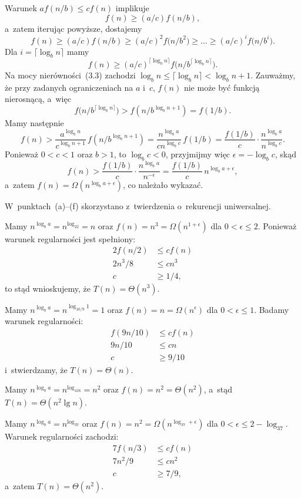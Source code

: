 \exercise %
Warunek $af(n/b)\le cf(n)$ implikuje
\[
	f(n) \ge (a/c)f(n/b),
\]
a~zatem iterując powyższe, dostajemy
\[
	f(n) \ge (a/c)f(n/b) \ge (a/c)^2f\bigl(n/b^2\bigr) \ge \dots \ge (a/c)^if\bigl(n/b^i\bigr).
\]
Dla $i=\lceil\log_bn\rceil$ mamy
\[
	f(n) \ge (a/c)^{\lceil\log_bn\rceil}f\bigl(n/b^{\lceil\log_bn\rceil}\bigr).
\]
Na mocy nierówności~(3.3) zachodzi $\log_bn\le\lceil\log_b n\rceil<\log_bn+1$. Zauważmy, że przy zadanych ograniczeniach na $a$ i~$c$, $f(n)$ nie może być funkcją nierosnącą, a~więc
\[
	f\bigl(n/b^{\lceil\log_bn\rceil}\bigr) > f(n/b^{\log_bn+1}) = f(1/b).
\]
Mamy następnie
\[
	f(n) > \frac{a^{\log_bn}}{c^{\log_bn+1}}\,f(n/b^{\log_bn+1}) = \frac{n^{\log_ba}}{cn^{\log_bc}}\,f(1/b) = \frac{f(1/b)}{c}\cdot\frac{n^{\log_ba}}{n^{\log_bc}}.
\]
Ponieważ $0<c<1$ oraz $b>1$, to $\log_bc<0$, przyjmijmy więc $\epsilon=-\log_bc$, skąd
\[
	f(n) > \frac{f(1/b)}{c}\cdot\frac{n^{\log_ba}}{n^{-\epsilon}} = \frac{f(1/b)}{c}\,n^{\log_ba+\epsilon},
\]
a~zatem $f(n)=\Omega(n^{\log_ba+\epsilon})$, co należało wykazać.

\problems

W~punktach~(a)\nobreakdash--(f) skorzystano z~twierdzenia o~rekurencji uniwersalnej.

\subproblem %
Mamy $n^{\log_ba}=n^{\log_22}=n$ oraz $f(n)=n^3=\Omega(n^{1+\epsilon})$ dla $0<\epsilon\le2$. Ponieważ warunek regularności jest spełniony:
\begin{align*}
	2f(n/2) &\le cf(n) \\
	2n^3\!/8 &\le cn^3 \\
	c &\ge 1/4,
\end{align*}
to stąd wnioskujemy, że $T(n)=\Theta(n^3)$.

\subproblem %
Mamy $n^{\log_ba}=n^{\log_{10/9}1}=1$ oraz $f(n)=n=\Omega(n^\epsilon)$ dla $0<\epsilon\le1$. Badamy warunek regularności:
\begin{align*}
	f(9n/10) &\le cf(n) \\
	9n/10 &\le cn \\
	c &\ge 9/10
\end{align*}
i~stwierdzamy, że $T(n)=\Theta(n)$.

\subproblem %
Mamy $n^{\log_ba}=n^{\log_416}=n^2$ oraz $f(n)=n^2=\Theta(n^2)$, a~stąd $T(n)=\Theta(n^2\lg n)$.

\subproblem %
Mamy $n^{\log_ba}=n^{\log_37}$ oraz $f(n)=n^2=\Omega(n^{\log_37+\epsilon})$ dla $0<\epsilon\le2-\log_37$. Warunek regularności zachodzi:
\begin{align*}
	7f(n/3) &\le cf(n) \\
	7n^2\!/9 &\le cn^2 \\
	c &\ge 7/9,
\end{align*}
a~zatem $T(n)=\Theta(n^2)$.

